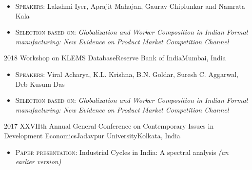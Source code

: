 \begin{conference}
{\begin{itemize}
                        \item \textsc{Speakers:} Lakshmi Iyer, Aprajit Mahajan, Gaurav Chiplunkar and Namrata Kala
                        \item \textsc{Selection based on:} \textit{Globalization and Worker Composition in Indian Formal manufacturing: New Evidence on Product Market Competition Channel}
                      \end{itemize}
                    }
\emptySeparator
  \experience
    {2018}   {Workshop on KLEMS Database}{Reserve Bank of India}{Mumbai, India}
    {} {
                      \begin{itemize}
                        \item \textsc{Speakers:} Viral Acharya, K.L. Krishna, B.N. Goldar, Suresh C. Aggarwal, Deb Kusum Das
                        \item \textsc{Selection based on:} \textit{Globalization and Worker Composition in Indian Formal manufacturing: New Evidence on Product Market Competition Channel}            
                      \end{itemize}
                    }
\emptySeparator
  \experience
    {2017}   {XXVIIth Annual General Conference on Contemporary Issues in Development Economics}{Jadavpur University}{Kolkata, India}
    {} {
                      \begin{itemize}
                        \item \textsc{Paper presentation:} Industrial Cycles in India: A spectral analysis \textit{(an earlier version)}
                      \end{itemize}
                    }

\end{conference}
